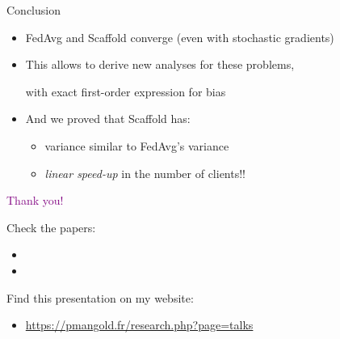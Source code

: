 \documentclass[aspectratio=169,12pt]{beamer}
\begin{document}
\begin{frame}{Conclusion}

  \begin{itemize}[itemsep=1em]
  \item FedAvg and Scaffold converge (even with stochastic gradients)
  \item This allows to derive new analyses for these problems,

    with exact first-order expression for bias
  \item And we proved that Scaffold has:
    \begin{itemize}
    \item variance similar to FedAvg's variance
    \item \textit{linear speed-up} in the number of clients!!
    \end{itemize}

  \end{itemize}
  
\end{frame}



\begin{frame}
  \begin{center}
    \huge \textcolor{purple}{
      Thank you!
      }
    \end{center}

    Check the papers:
    \vspace{-1em}
    \begin{itemize}
    \item \small {}
    \item \small {}
    \end{itemize}

    Find this presentation on my website:
    \vspace{-1em}
    \begin{itemize}
    \item \textcolor{amaranth}{\url{https://pmangold.fr/research.php?page=talks}}
    \end{itemize}
    
\end{frame}
\end{document}
